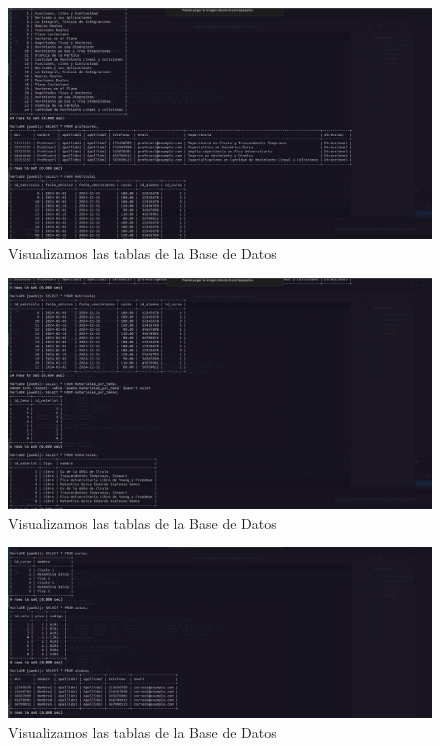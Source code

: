 \begin{figure}[H]
  \centering
  \includegraphics[width=1.0\textwidth]{img/Viendo_Datos_3.png}
  \caption{Visualizamos las tablas de la Base de Datos}
\end{figure}
\begin{figure}[H]
  \centering
  \includegraphics[width=1.0\textwidth]{img/Viendo_Datos_2.png}
  \caption{Visualizamos las tablas de la Base de Datos}
\end{figure}
\begin{figure}[H]
  \centering
  \includegraphics[width=1.0\textwidth]{img/Viendo_Datos_1.png}
  \caption{Visualizamos las tablas de la Base de Datos}
\end{figure}

